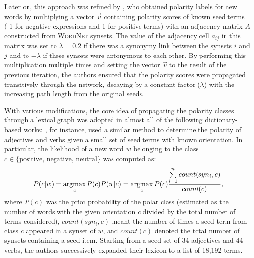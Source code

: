 Later on, this approach was refined by \citet{Blair-Goldensohn:08},
who obtained polarity labels for new words by multiplying a vector
$\vec{v}$ containing polarity scores of known seed terms (-1 for
negative expressions and 1 for positive terms) with an adjacency
matrix $A$ constructed from \textsc{WordNet} synsets.  The value of
the adjacency cell $a_{ij}$ in this matrix was set to $\lambda=0.2$ if
there was a synonymy link between the synsets $i$ and $j$ and to
$-\lambda$ if these synsets were antonymous to each other.  By
performing this multiplication multiple times and setting the vector
$\vec{v}$ to the result of the previous iteration, the authors ensured
that the polarity scores were propagated transitively through the
network, decaying by a constant factor ($\lambda$) with the increasing
path length from the original
seeds.%

With various modifications, the core idea of propagating the polarity
classes through a lexical graph was adopted in almost all of the
following dictionary-based works: \citet{Kim:04,Kim:06}, for instance,
used a similar method to determine the polarity of adjectives and
verbs given a small set of seed terms with known orientation.  In
particular, the likelihood of a new word $w$ belonging to the class $c
\in \{\textrm{positive, negative, neutral}\}$ was computed as:
\begin{equation*}
  P(c|w) = \argmax_{c}P(c)P(w|c) = \argmax_{c}P(c)\frac{\sum\limits_{i=1}^{n}count(syn_i, c)}{count(c)},
\end{equation*}
where $P(c)$ was the prior probability of the polar class (estimated
as the number of words with the given orientation $c$ divided by the
total number of terms considered), $count(syn_i, c)$ meant the number
of times a seed term from class $c$ appeared in a synset of $w$, and
$count(c)$ denoted the total number of synsets containing a seed item.
Starting from a seed set of 34 adjectives and 44 verbs, the authors
successively expanded their lexicon to a list of 18,192 terms. %

